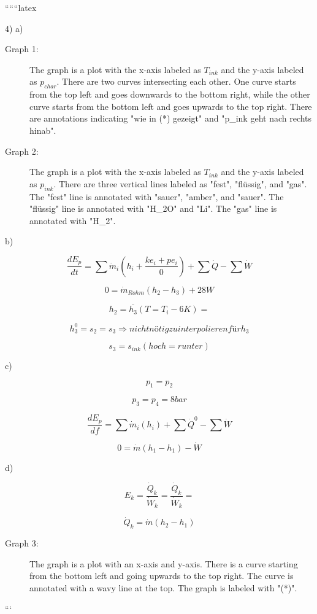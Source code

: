 
``````latex


4) a)

\begin{description}
    \item[Graph 1:] The graph is a plot with the x-axis labeled as $T_{ink}$ and the y-axis labeled as $p_{char}$. There are two curves intersecting each other. One curve starts from the top left and goes downwards to the bottom right, while the other curve starts from the bottom left and goes upwards to the top right. There are annotations indicating "wie in (*) gezeigt" and "p_{ink} geht nach rechts hinab".
    \item[Graph 2:] The graph is a plot with the x-axis labeled as $T_{ink}$ and the y-axis labeled as $p_{ink}$. There are three vertical lines labeled as "fest", "flüssig", and "gas". The "fest" line is annotated with "sauer", "amber", and "sauer". The "flüssig" line is annotated with "H_2O" and "Li". The "gas" line is annotated with "H_2".
\end{description}

b)

\[
\frac{dE_{p}}{dt} = \sum \dot{m}_i (h_i + \frac{ke_i + pe_i}{0}) + \sum \dot{Q} - \sum \dot{W}
\]

\[
0 = \dot{m}_{Rohm} (h_2 - h_3) + 28W
\]

\[
h_2 = \overline{h_3} (T = T_i - 6K) =
\]

\[
h_3^0 = s_2 = s_3 \Rightarrow nicht nötig zu interpolieren für h_3
\]

\[
s_3 = s_{ink} (hoch = runter)
\]

c)

\[
p_1 = p_2
\]

\[
p_3 = p_4 = 8 bar
\]

\[
\frac{dE_{p}}{df} = \sum \dot{m}_i (h_i) + \sum \dot{Q}^0 - \sum \dot{W}
\]

\[
0 = \dot{m} (h_1 - h_1) - \dot{W}
\]

d)

\[
E_k = \frac{\dot{Q}_k}{\dot{W}_k} = \frac{\dot{Q}_k}{\dot{W}_k} =
\]

\[
\dot{Q}_k = \dot{m} (h_2 - h_1)
\]

\begin{description}
    \item[Graph 3:] The graph is a plot with an x-axis and y-axis. There is a curve starting from the bottom left and going upwards to the top right. The curve is annotated with a wavy line at the top. The graph is labeled with "(*)".
\end{description}

```